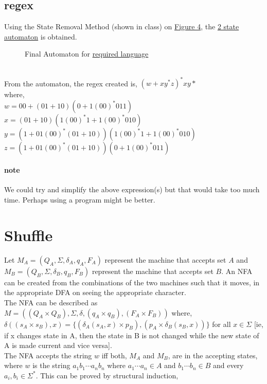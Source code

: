 \documentclass[11pt,letterpaper]{article}
\begin{document}
\subsection{regex}
Using the State Removal Method (shown in class) on \hyperref[fig:2b]{Figure 4}, the \hyperref[fig:2c]{2 state automaton} is obtained.
\begin{figure}[!ht]
\label{fig:2c}
\centering
{}
\caption{Final Automaton for \hyperref[sec:2]{required language}}
\end{figure}
\\
From the automaton, the regex created is, $(w + xy^*z)^*xy*$ \\
where, \\
$w = 00 + (01+10)(0+1(00)^*011)$ \\
$x = (01+10)(1(00)^*1+1(00)^*010)$ \\
$y = (1 + 01(00)^*(01+10))(1(00)^*1+1(00)^*010)$ \\
$z = (1 + 01(00)^*(01+10))(0+1(00)^*011)$
\paragraph{note}
We could try and simplify the above expression(s) but that would take too much time. Perhaps using a program might be better.

\section{Shuffle}
Let $M_A = (Q_A, \Sigma, \delta_A, q_A, F_A)$ represent the machine that accepts set $A$ and $M_B = (Q_B, \Sigma, \delta_B, q_B, F_B)$ represent the machine that accepts set $B$. An NFA can be created from the combinations of the two machines such that it moves, in the appropriate DFA on seeing the appropriate character. \\
The NFA can be described as $M = ((Q_A \times Q_B), \Sigma, \delta, (q_A \times q_B), (F_A \times F_B))$ where, $\delta ((s_A \times s_B),x) = \{(\delta_A (s_A,x) \times p_B), (p_A \times \delta_B (s_B,x))\}$ for all $x \in \Sigma$ [ie, if x changes state in A, then the state in B is not changed while the new state of A is made current and vice versa]. \\
The NFA accepts the string $w$ iff both, $M_A$ and $M_B$, are in the accepting states, where $w$ is the string $a_1b_1 \cdots a_nb_n$ where $a_1 \cdots a_n \in A$ and  $b_1 \cdots b_n \in B$ and every $a_i,b_i \in \Sigma^*$. This can be proved by structural induction,
\end{document}
